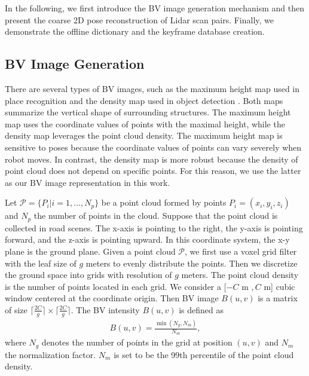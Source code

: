 \documentclass[letterpaper, 10 pt, journal, twoside]{IEEEtran}
\begin{document}
 In the following, we first introduce the BV image generation mechanism and then present the coarse 2D pose reconstruction of Lidar scan pairs. Finally, we demonstrate the offline dictionary and the keyframe database creation.


\subsection{BV Image Generation}
There are several types of BV images, such as the maximum height map used in place recognition \cite{kim2018scan} and the density map used in object detection \cite{chen2017multi}. Both maps summarize the vertical shape of surrounding structures. The maximum height map uses the coordinate values of points with the maximal height, while the density map leverages the point cloud density. The maximum height map is sensitive to poses because the coordinate values of points can vary severely when robot moves. In contrast, the density map is more robust because the density of point cloud does not depend on specific points. For this reason, we use the latter as our BV image representation in this work.


Let $\mathcal{P}=\{P_i|i=1,...,N_p\}$ be a point cloud formed by points $P_i=(x_i,y_i,z_i)$ and $N_p$ the number of points in the cloud. Suppose that the point cloud is collected in road scenes. {The x-axis is pointing to the right, the y-axis is pointing forward, and the z-axis is pointing upward.} In this coordinate system, the x-y plane is the ground plane. Given a point cloud $\mathcal{P}$, we first use a voxel grid filter with the leaf size of $g$ meters to evenly distribute the points. Then we discretize the ground space into grids with resolution of $g$ meters. The point cloud density is the number of points located in each grid. We consider a [$-C $ m $, C $ m] cubic window centered at the coordinate origin. Then BV image $B(u,v)$ is a matrix of size $\lceil{\frac{2C}{g}} \rceil \times \lceil{\frac{2C}{g}}\rceil$. The BV intensity $B(u,v)$ is defined as
\begin{equation}
        \label{eq:BV image}
        \begin{aligned}
        B(u,v)=\frac{\min(N_g,N_m)}{N_m},
        \end{aligned}
\end{equation}
where $N_g$ denotes the number of points in the grid at position $(u,v)$ and $N_m$ the normalization factor. $N_m$ is set to be the 99th percentile of the point cloud density. %
\end{document}
